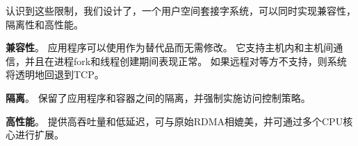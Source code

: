 



认识到这些限制，我们设计了\sys {}，一个用户空间套接字系统，可以同时实现兼容性，隔离性和高性能。
\begin{ecompact}
\item \textbf {兼容性}。
应用程序可以使用\sys {}作为替代品而无需修改。
它支持主机内和主机间通信，并且在进程fork和线程创建期间表现正常。
如果远程对等方不支持\sys {}，则系统将透明地回退到TCP。
\item \textbf {隔离}。
\sys {}保留了应用程序和容器之间的隔离，并强制实施访问控制策略。
\item \textbf {高性能}。
\sys {}提供高吞吐量和低延迟，可与原始RDMA相媲美，并可通过多个CPU核心进行扩展。
\end{ecompact}


